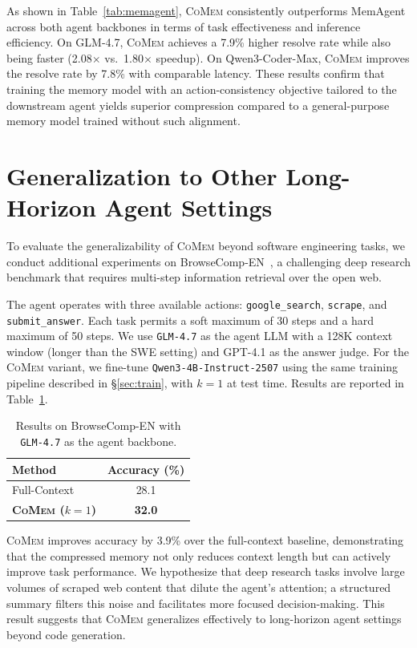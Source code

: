 \documentclass{article}
\theoremstyle{plain}
\theoremstyle{definition}
\theoremstyle{remark}
\newcommand{\model}{\textsc{CoMem}\xspace}
\begin{document}
As shown in Table~\ref{tab:memagent}, {\model} consistently outperforms MemAgent across both agent backbones in terms of task effectiveness and inference efficiency. On GLM-4.7, {\model} achieves a 7.9\% higher resolve rate while also being faster (2.08$\times$ vs.\ 1.80$\times$ speedup). On Qwen3-Coder-Max, {\model} improves the resolve rate by 7.8\% with comparable latency. These results confirm that training the memory model with an action-consistency objective tailored to the downstream agent yields superior compression compared to a general-purpose memory model trained without such alignment.

\section{Generalization to Other Long-Horizon Agent Settings}
\label{app:browsecomp}

To evaluate the generalizability of {\model} beyond software engineering tasks, we conduct additional experiments on BrowseComp-EN~\citep{wei2025browsecomp}, a challenging deep research benchmark that requires multi-step information retrieval over the open web.

The agent operates with three available actions: \texttt{google\_search}, \texttt{scrape}, and \texttt{submit\_answer}. Each task permits a soft maximum of 30 steps and a hard maximum of 50 steps. We use \texttt{GLM-4.7} as the agent LLM with a 128K context window (longer than the SWE setting) and GPT-4.1 as the answer judge. For the {\model} variant, we fine-tune \texttt{Qwen3-4B-Instruct-2507} using the same training pipeline described in \S\ref{sec:train}, with $k=1$ at test time. Results are reported in Table~\ref{tab:browsecomp}.

\begin{table}[h]
\centering
\setlength{\tabcolsep}{6pt}
\renewcommand{\arraystretch}{1.3}
\caption{Results on BrowseComp-EN with \texttt{GLM-4.7} as the agent backbone.}
\label{tab:browsecomp}
\begin{tabular}{l c}
\toprule
Method & Accuracy (\%) \\
\midrule
Full-Context & 28.1 \\
\textbf{{\model} ($k=1$)} & \textbf{32.0} \\
\bottomrule
\end{tabular}
\end{table}

{\model} improves accuracy by 3.9\% over the full-context baseline, demonstrating that the compressed memory not only reduces context length but can actively improve task performance. We hypothesize that deep research tasks involve large volumes of scraped web content that dilute the agent's attention; a structured summary filters this noise and facilitates more focused decision-making. This result suggests that {\model} generalizes effectively to long-horizon agent settings beyond code generation.
\end{document}
